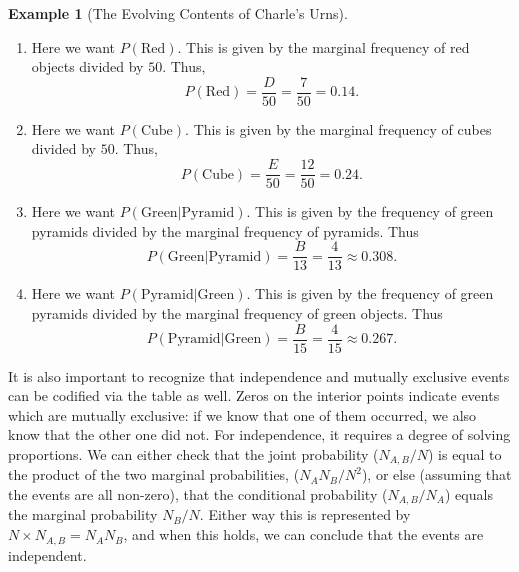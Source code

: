 \documentclass[
  letterpaper,
  DIV=11,
  numbers=noendperiod]{scrreprt}
\theoremstyle{definition}
\theoremstyle{definition}
\newtheorem{example}{Example}[chapter]
\theoremstyle{definition}
\theoremstyle{remark}
\begin{document}
\begin{example}[The Evolving Contents of Charle's
Urns]
\begin{tcolorbox}[enhanced jigsaw, colback=white, colframe=quarto-callout-color-frame, arc=.35mm, leftrule=.75mm, rightrule=.15mm, opacityback=0, breakable, bottomrule=.15mm, left=2mm, toprule=.15mm]
\begin{enumerate}
  Here we want \(P(\text{Black}, \text{Cube})\). This is given by the
  frequency of black cubes divided by \(50\). Thus,
  \[P(\text{Black}, \text{Cube}) = \frac{A}{50} = \frac{4}{50} = 0.08.\]
\item
  Here we want \(P(\text{Red})\). This is given by the marginal
  frequency of red objects divided by \(50\). Thus,
  \[P(\text{Red}) = \frac{D}{50} = \frac{7}{50} = 0.14.\]
\item
  Here we want \(P(\text{Cube})\). This is given by the marginal
  frequency of cubes divided by \(50\). Thus,
  \[P(\text{Cube}) = \frac{E}{50} = \frac{12}{50} = 0.24.\]
\item
  Here we want \(P(\text{Green}|\text{Pyramid})\). This is given by the
  frequency of green pyramids divided by the marginal frequency of
  pyramids. Thus
  \[P(\text{Green}|\text{Pyramid}) = \frac{B}{13} = \frac{4}{13} \approx 0.308.\]
\item
  Here we want \(P(\text{Pyramid}|\text{Green})\). This is given by the
  frequency of green pyramids divided by the marginal frequency of green
  objects.\footnotemark{} Thus
  \[P(\text{Pyramid}|\text{Green}) = \frac{B}{15} = \frac{4}{15} \approx 0.267.\]
\end{enumerate}

\end{tcolorbox}





\end{example}

It is also important to recognize that independence and mutually
exclusive events can be codified via the table as well. Zeros on the
interior points indicate events which are mutually exclusive: if we know
that one of them occurred, we also know that the other one did not. For
independence, it requires a degree of solving proportions. We can either
check that the joint probability (\(N_{A,B}/N\)) is equal to the product
of the two marginal probabilities, (\(N_AN_B/N^2\)), or else (assuming
that the events are all non-zero), that the conditional probability
(\(N_{A,B}/N_A\)) equals the marginal probability \(N_B/N\). Either way
this is represented by \(N\times N_{A,B} = N_AN_B\), and when this
holds, we can conclude that the events are independent.
\end{document}
